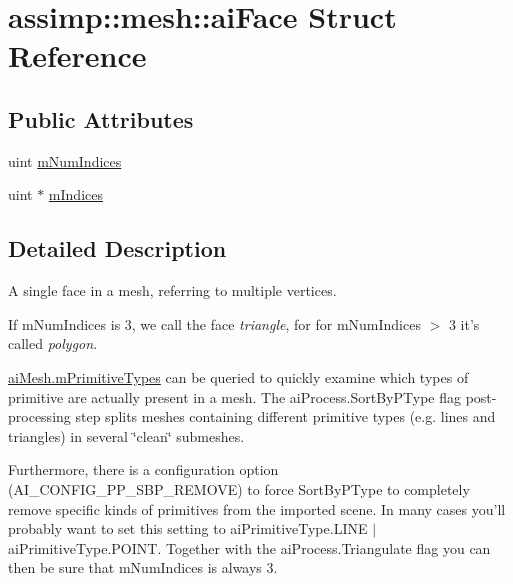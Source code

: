 \hypertarget{structassimp_1_1mesh_1_1ai_face}{\section{assimp\+:\+:mesh\+:\+:ai\+Face Struct Reference}
\label{structassimp_1_1mesh_1_1ai_face}
}
\subsection*{Public Attributes}
\begin{DoxyCompactItemize}
\item 
uint \hyperlink{structassimp_1_1mesh_1_1ai_face_a8968f7452844b692c5fbd79764ec41c8}{m\+Num\+Indices}
\item 
uint $\ast$ \hyperlink{structassimp_1_1mesh_1_1ai_face_ada4a5dca43ff829a1e7b8b855b652b04}{m\+Indices}
\end{DoxyCompactItemize}


\subsection{Detailed Description}
A single face in a mesh, referring to multiple vertices.

If {\ttfamily m\+Num\+Indices} is 3, we call the face {\itshape triangle}, for for {\ttfamily m\+Num\+Indices $>$ 3} it's called {\itshape polygon}.

{\ttfamily \hyperlink{structassimp_1_1mesh_1_1ai_mesh_a44f34796ead653c34b9cf15cf2ea3ca4}{ai\+Mesh.\+m\+Primitive\+Types}} can be queried to quickly examine which types of primitive are actually present in a mesh. The {\ttfamily ai\+Process.\+Sort\+By\+P\+Type} flag post-\/processing step splits meshes containing different primitive types (e.\+g. lines and triangles) in several \char`\"{}clean\char`\"{} submeshes.

Furthermore, there is a configuration option ({\ttfamily A\+I\+\_\+\+C\+O\+N\+F\+I\+G\+\_\+\+P\+P\+\_\+\+S\+B\+P\+\_\+\+R\+E\+M\+O\+V\+E}) to force {\ttfamily Sort\+By\+P\+Type} to completely remove specific kinds of primitives from the imported scene. In many cases you'll probably want to set this setting to {\ttfamily ai\+Primitive\+Type.\+L\+I\+N\+E $\vert$ ai\+Primitive\+Type.\+P\+O\+I\+N\+T}. Together with the {\ttfamily ai\+Process.\+Triangulate} flag you can then be sure that {\ttfamily m\+Num\+Indices} is always 3. 

